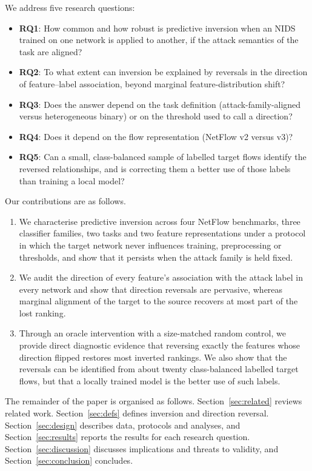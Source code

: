 \documentclass[preprint,12pt]{elsarticle}
\newcommand{\RQ}[1]{\textbf{RQ#1}}
\begin{document}
We address five research questions:
\begin{itemize}
\item \RQ{1}: How common and how robust is predictive inversion when an NIDS trained on one network is applied to another, if the attack semantics of the task are aligned?
\item \RQ{2}: To what extent can inversion be explained by reversals in the direction of feature--label association, beyond marginal feature-distribution shift?
\item \RQ{3}: Does the answer depend on the task definition (attack-family-aligned versus heterogeneous binary) or on the threshold used to call a direction?
\item \RQ{4}: Does it depend on the flow representation (NetFlow v2 versus v3)?
\item \RQ{5}: Can a small, class-balanced sample of labelled target flows identify the reversed relationships, and is correcting them a better use of those labels than training a local model?
\end{itemize}

Our contributions are as follows.
\begin{enumerate}
\item We characterise predictive inversion across four NetFlow benchmarks, three classifier families, two tasks and two feature representations under a protocol in which the target network never influences training, preprocessing or thresholds, and show that it persists when the attack family is held fixed.
\item We audit the direction of every feature's association with the attack label in every network and show that direction reversals are pervasive, whereas marginal alignment of the target to the source recovers at most part of the lost ranking.
\item Through an oracle intervention with a size-matched random control, we provide direct diagnostic evidence that reversing exactly the features whose direction flipped restores most inverted rankings. We also show that the reversals can be identified from about twenty class-balanced labelled target flows, but that a locally trained model is the better use of such labels.
\end{enumerate}

The remainder of the paper is organised as follows. Section~\ref{sec:related} reviews related work. Section~\ref{sec:defs} defines inversion and direction reversal. Section~\ref{sec:design} describes data, protocols and analyses, and Section~\ref{sec:results} reports the results for each research question. Section~\ref{sec:discussion} discusses implications and threats to validity, and Section~\ref{sec:conclusion} concludes.
\end{document}
